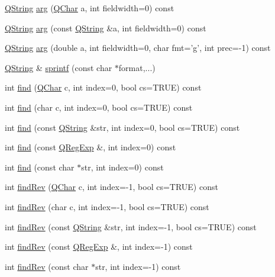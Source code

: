 \begin{DoxyCompactItemize}
\hyperlink{class_q_string}{Q\-String} \hyperlink{class_q_string_a3de53812b85729641e5db7415ff797f2}{arg} (\hyperlink{class_q_char}{Q\-Char} a, int fieldwidth=0) const 
\item 
\hyperlink{class_q_string}{Q\-String} \hyperlink{class_q_string_a3e1f2e49206972c13d69b278b56a76f6}{arg} (const \hyperlink{class_q_string}{Q\-String} \&a, int fieldwidth=0) const 
\item 
\hyperlink{class_q_string}{Q\-String} \hyperlink{class_q_string_a3574bcdc4ea9270879a75eb5695043f2}{arg} (double a, int fieldwidth=0, char fmt='g', int prec=-\/1) const 
\item 
\hyperlink{class_q_string}{Q\-String} \& \hyperlink{class_q_string_a34d369803a6568a461041b34c9ed33d6}{sprintf} (const char $\ast$format,...)
\item 
int \hyperlink{class_q_string_acca4eda6c3d39e174d06ad9a556be100}{find} (\hyperlink{class_q_char}{Q\-Char} c, int index=0, bool cs=T\-R\-U\-E) const 
\item 
int \hyperlink{class_q_string_ad64e3aef2a281ce7550aee1970a86a7e}{find} (char c, int index=0, bool cs=T\-R\-U\-E) const 
\item 
int \hyperlink{class_q_string_a026b817c9714631b0317ecd313441cab}{find} (const \hyperlink{class_q_string}{Q\-String} \&str, int index=0, bool cs=T\-R\-U\-E) const 
\item 
int \hyperlink{class_q_string_a7d7d4fe2b8d9279521d5b89fbde1052d}{find} (const \hyperlink{class_q_reg_exp}{Q\-Reg\-Exp} \&, int index=0) const 
\item 
int \hyperlink{class_q_string_a0e69aba9558d2d7ce78ad43510c44c47}{find} (const char $\ast$str, int index=0) const 
\item 
int \hyperlink{class_q_string_aab366beeaa42b1d37be6a9775e2de18b}{find\-Rev} (\hyperlink{class_q_char}{Q\-Char} c, int index=-\/1, bool cs=T\-R\-U\-E) const 
\item 
int \hyperlink{class_q_string_a1c9c5fa7edcc9f59b7ad419554a31270}{find\-Rev} (char c, int index=-\/1, bool cs=T\-R\-U\-E) const 
\item 
int \hyperlink{class_q_string_a39983b1220ebb1493284ca4fa0af4752}{find\-Rev} (const \hyperlink{class_q_string}{Q\-String} \&str, int index=-\/1, bool cs=T\-R\-U\-E) const 
\item 
int \hyperlink{class_q_string_ac8a7fd641cbd6e1d9704c2a37547f7dd}{find\-Rev} (const \hyperlink{class_q_reg_exp}{Q\-Reg\-Exp} \&, int index=-\/1) const 
\item 
int \hyperlink{class_q_string_a4be04fa13607acd10f329bcf318f2c42}{find\-Rev} (const char $\ast$str, int index=-\/1) const 

\end{DoxyCompactItemize}
